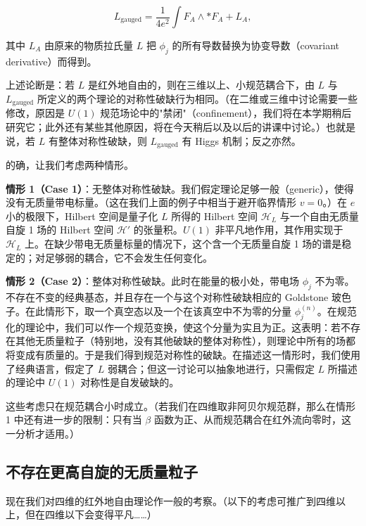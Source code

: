 \begin{equation}
  \tag{2.5}
  \label{eq:2-5}
  L_{\text{gauged}}=\frac{1}{4e^2}\int F_A\wedge *F_A+L_A,
\end{equation}

其中 $L_A$ 由原来的物质拉氏量 $L$ 把 $\phi_j$ 的所有导数替换为协变导数（covariant derivative）而得到。


上述论断是：若 $L$ 是红外地自由的，则在三维以上、小规范耦合下，由 $L$ 与 $L_{\text{gauged}}$ 所定义的两个理论的对称性破缺行为相同。（在二维或三维中讨论需要一些修改，原因是 $U(1)$ 规范场论中的"禁闭"（confinement），我们将在本学期稍后研究它；此外还有某些其他原因，将在今天稍后以及以后的讲课中讨论。）也就是说，若 $L$ 有整体对称性破缺，则 $L_{\text{gauged}}$ 有 Higgs 机制；反之亦然。

的确，让我们考虑两种情形。

\textbf{情形 1（Case 1）}：无整体对称性破缺。我们假定理论足够一般（generic），使得没有无质量带电标量。（这在我们上面的例子中相当于避开临界情形 $v=0$。）在 $e$ 小的极限下，Hilbert 空间是量子化 $L$ 所得的 Hilbert 空间 $\mathcal{H}_L$ 与一个自由无质量自旋 1 场的 Hilbert 空间 $\mathcal{H}'$ 的张量积。$U(1)$ 非平凡地作用，其作用实现于 $\mathcal{H}_L$ 上。在缺少带电无质量标量的情况下，这个含一个无质量自旋 1 场的谱是稳定的；对足够弱的耦合，它不会发生任何变化。

\textbf{情形 2（Case 2）}：整体对称性破缺。此时在能量的极小处，带电场 $\phi_j$ 不为零。不存在不变的经典基态，并且存在一个与这个对称性破缺相应的 Goldstone 玻色子。在此情形下，取一个真空态以及一个在该真空中不为零的分量 $\phi_j^{(n)}$。在规范化的理论中，我们可以作一个规范变换，使这个分量为实且为正。这表明：若不存在其他无质量粒子（特别地，没有其他破缺的整体对称性），则理论中所有的场都将变成有质量的。于是我们得到规范对称性的破缺。在描述这一情形时，我们使用了经典语言，假定了 $L$ 弱耦合；但这一讨论可以抽象地进行，只需假定 $L$ 所描述的理论中 $U(1)$ 对称性是自发破缺的。

这些考虑只在规范耦合小时成立。（若我们在四维取非阿贝尔规范群，那么在情形 1 中还有进一步的限制：只有当 $\beta$ 函数为正、从而规范耦合在红外流向零时，这一分析才适用。）

\subsection{不存在更高自旋的无质量粒子}

现在我们对四维的红外地自由理论作一般的考察。（以下的考虑可推广到四维以上，但在四维以下会变得平凡……）

